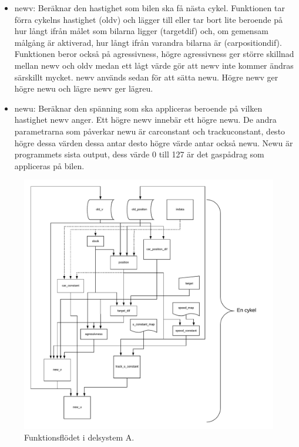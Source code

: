 \begin{itemize}
\item new\textunderscore v: Beräknar den hastighet som bilen ska få nästa cykel. Funktionen tar förra cykelns hastighet (old\textunderscore v) 
och lägger till eller tar bort lite beroende på hur långt ifrån målet som bilarna ligger (target\textunderscore dif) och, om gemensam
målgång är aktiverad, hur långt ifrån varandra bilarna är (car\textunderscore position\textunderscore dif). Funktionen beror 
också på agressivness, högre agressivness ger större skillnad mellan new\textunderscore v och old\textunderscore v medan ett lågt värde gör att new\textunderscore v 
inte kommer ändras särskillt mycket.
new\textunderscore v används sedan för att sätta
new\textunderscore u. Högre new\textunderscore v ger högre new\textunderscore u och lägre new\textunderscore v ger lägre\textunderscore u. 
	
\item new\textunderscore u: Beräknar den spänning som ska appliceras beroende på vilken hastighet new\textunderscore v anger. Ett högre new\textunderscore v innebär ett högre new\textunderscore u. De andra parametrarna som påverkar new\textunderscore u är car\textunderscore constant och track\textunderscore u\textunderscore constant, desto högre dessa värden dessa antar desto högre värde antar också new\textunderscore u. New\textunderscore u är programmets sista output, dess värde 0 till 127 är det gaspådrag som appliceras på bilen.
    \end{itemize}

    \begin{figure}
      \centering
      \includegraphics[width=\linewidth]{figures/flow.pdf}
      \caption{Funktionsflödet i delsystem A.}%
      \label{fig:flow_diagram}
    \end{figure}

